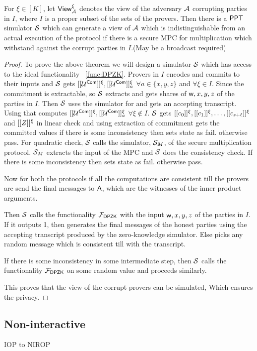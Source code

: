 \begin{lemma}\label{lem:privacy}
	For $\xi\in [K]$, let $\mathsf{View}^{\xi}_{\mathcal{A}}$ denotes the view of the adversary $\mathcal{A}$ corrupting parties in $I$, where $I$ is a proper subset of the sets of the provers. Then there is a $\mathsf{PPT}$ simulator $\mathcal{S}$ which can generate a view of $\mathcal{A}$ which is indistinguishable from an actual execution of the protocol if there is a secure MPC for multiplication which withstand against the corrupt parties in $I$.(May be a broadcast required)
\end{lemma}

\begin{proof}
	To prove the above theorem we will design a simulator $\mathcal{S}$ which has access to the ideal functionality ~\ref{func:DPZK}. Provers in $I$ encodes and commits to their inputs and $\mathcal{S}$ gets $[[{\mathcal{U}^{\mathsf{Com}}}]]^\xi, [[{\mathcal{U}^{\mathsf{Com}}}]]^\xi_a$ $\forall a\in\{x,y,z\}$ and $\forall \xi \in I$. Since the commitment is extractable, so $\mathcal{S}$ extracts and gets shares of $\mathsf{w}, x,y,z$ of the parties in $I$. 
	Then $\mathcal{S}$ uses the simulator for \name and gets an accepting transcript. Using that computes $[[{\mathcal{U}^{\mathsf{Com}}}]]^\xi, [[{\mathcal{U}^{\mathsf{Com}}}]]^\xi_a$ $\forall \xi\notin I$.
	$\mathcal{S}$ gets $[[{c_0}]]^\xi, [[{c_1}]]^\xi, \ldots, [[{c_{s+\ell}}]]^\xi$ and $[[{Z}]]^\xi$ in linear check and using extraction of commitment gets the committed values if there is some inconsistency then 
	sets state as fail. otherwise pass.
	For quadratic check, $\mathcal{S}$ calls the simulator, $\mathcal{S}_M$, of the secure multiplication protocol. $\mathcal{S}_M$ extracts the input of the MPC and $\mathcal{S}$ does the consistency check. If there is some inconsistency then 
	sets state as fail. otherwise pass.
	
	Now for both the protocols if all the computations are consistent till the provers are send the final messages to $\mathsf{A}$, which are the witnesses of the inner product arguments.
	
	Then $\mathcal{S}$ calls the functionality $\mathcal{F}_{\mathsf{DPZK}}$ with the input $\mathsf{w}, x,y,z$ of the parties in $I$. If it outputs 1, then generates the final messages of the honest parties using the accepting transcript produced by the zero-knowledge simulator. Else picks any random message which is consistent till with the transcript.
	
	If there is some inconsistency in some intermediate step, then $\mathcal{S}$ calls the functionality $\mathcal{F}_{\mathsf{DPZK}}$ on some random value and proceeds similarly.
	
	This proves that the view of the corrupt provers can be simulated, Which ensures the privacy.
\end{proof}

   



\subsection{Non-interactive}
IOP to NIROP
